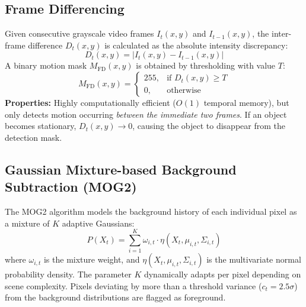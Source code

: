 \documentclass[12pt]{article}
\begin{document}
\subsection{Frame Differencing}
Given consecutive grayscale video frames $I_t(x, y)$ and $I_{t-1}(x, y)$, the inter-frame difference $D_t(x, y)$ is calculated as the absolute intensity discrepancy:
\begin{equation}
    D_t(x, y) = |I_t(x, y) - I_{t-1}(x, y)|
\end{equation}
A binary motion mask $M_{\text{FD}}(x, y)$ is obtained by thresholding with value $T$:
\begin{equation}
    M_{\text{FD}}(x, y) = 
    \begin{cases} 
        255, & \text{if } D_t(x, y) \ge T \\
        0, & \text{otherwise}
    \end{cases}
\end{equation}
\textbf{Properties:} Highly computationally efficient ($O(1)$ temporal memory), but only detects motion occurring \emph{between the immediate two frames}. If an object becomes stationary, $D_t(x, y) \to 0$, causing the object to disappear from the detection mask.

\subsection{Gaussian Mixture-based Background Subtraction (MOG2)}
The MOG2 algorithm models the background history of each individual pixel as a mixture of $K$ adaptive Gaussians:
\begin{equation}
    P(X_t) = \sum_{i=1}^K \omega_{i, t} \cdot \eta(X_t, \mu_{i, t}, \Sigma_{i, t})
\end{equation}
where $\omega_{i, t}$ is the mixture weight, and $\eta(X_t, \mu_{i, t}, \Sigma_{i, t})$ is the multivariate normal probability density. The parameter $K$ dynamically adapts per pixel depending on scene complexity. Pixels deviating by more than a threshold variance ($c_t = 2.5\sigma$) from the background distributions are flagged as foreground.
\end{document}
